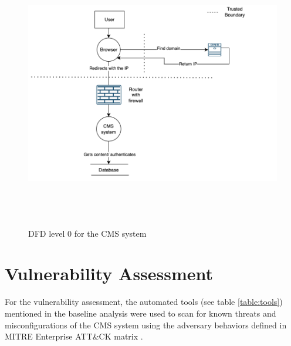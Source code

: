\begin{figure}[h!]
\centering
\includegraphics[width=\textwidth, height=450px]{pics/dfd.png}
\caption{DFD level 0 for the CMS system}\label{fig:dfd}
\end{figure}


\section{Vulnerability Assessment}
For the vulnerability assessment, the automated tools (see table \ref{table:tools}) mentioned in the baseline analysis were used to scan for known threats and misconfigurations of the CMS system using the adversary behaviors defined in MITRE Enterprise ATT\&CK matrix \citep[p.~158]{xiong2022cyber}.

